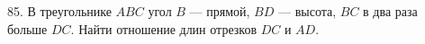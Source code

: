 85. В треугольнике $ABC$ угол $B$ --- прямой, $BD$ --- высота,  $BC$ в два раза больше $DC.$ Найти отношение длин отрезков $DC$ и $AD.$\\
